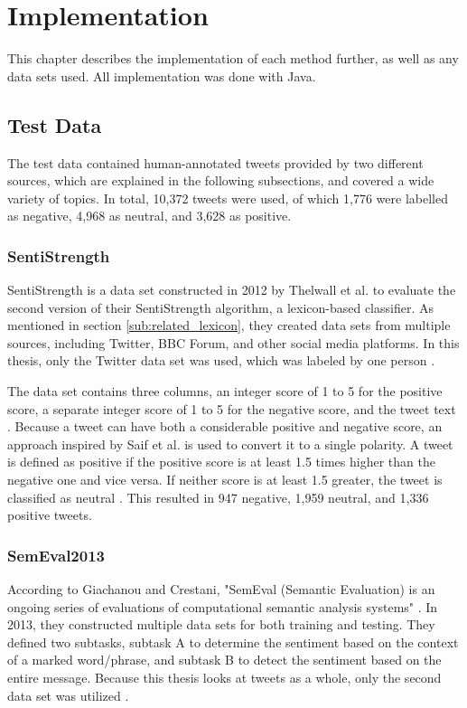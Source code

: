 \chapter{Implementation}
\label{cha:Chapter5_Implementation}
This chapter describes the implementation of each method further, as well as any data sets used. All implementation was done with Java.
\section{Test Data}
The test data contained human-annotated tweets provided by two different sources, which are explained in the following subsections, and covered a wide variety of topics. In total, 10,372 tweets were used, of which 1,776 were labelled as negative, 4,968 as neutral, and 3,628 as positive.

\subsection{SentiStrength}
SentiStrength is a data set constructed in 2012 by Thelwall et al. to evaluate the second version of their SentiStrength algorithm, a lexicon-based classifier. As mentioned in section \ref{sub:related_lexicon}, they created data sets from multiple sources, including Twitter, BBC Forum, and other social media platforms. In this thesis, only the Twitter data set was used, which was labeled by one person \cite{10.1002/asi.21662}.

The data set contains three columns, an integer score of 1 to 5 for the positive score, a separate integer score of 1 to 5 for the negative score, and the tweet text \cite{10.1002/asi.21662}. Because a tweet can have both a considerable positive and negative score, an approach inspired by Saif et al. is used to convert it to a single polarity. A tweet is defined as positive if the positive score is at least 1.5 times higher than the negative one and vice versa. If neither score is at least 1.5 greater, the tweet is classified as neutral \cite{oro40660}. This resulted in 947 negative, 1,959 neutral, and 1,336 positive tweets.

\subsection{SemEval2013}
According to Giachanou and Crestani, "SemEval (Semantic Evaluation) is an ongoing series of evaluations of computational semantic analysis systems" \cite[p.~28:31]{DBLP:journals/csur/GiachanouC16}. In 2013, they constructed multiple data sets for both training and testing. They defined two subtasks, subtask A to determine the sentiment based on the context of a marked word/phrase, and subtask B to detect the sentiment based on the entire message. Because this thesis looks at tweets as a whole, only the second data set was utilized \cite{nakov-etal-2013-semeval}.

